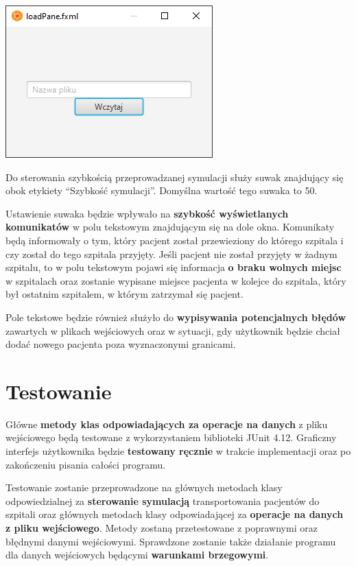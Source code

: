 \documentclass{article}
\begin{document}
    \begin{center}
        \includegraphics{okno.png}
    \end{center}

    Do sterowania szybkością przeprowadzanej symulacji służy suwak znajdujący się obok etykiety ``Szybkość symulacji''. Domyślna wartość tego suwaka to 50.

    Ustawienie suwaka będzie wpływało na \textbf{szybkość wyświetlanych komunikatów} w polu tekstowym znajdującym się na dole okna. Komunikaty będą informowały o tym, który pacjent został przewieziony do którego szpitala i czy został do tego szpitala przyjęty. Jeśli pacjent nie został przyjęty w żadnym szpitalu, to w polu tekstowym pojawi się informacja \textbf{o braku wolnych miejsc} w szpitalach oraz zostanie wypisane miejsce pacjenta w kolejce do szpitala, który był ostatnim szpitalem, w którym zatrzymał się pacjent.

    Pole tekstowe będzie również służyło do \textbf{wypisywania potencjalnych błędów} zawartych w plikach wejściowych oraz w sytuacji, gdy użytkownik będzie chciał dodać nowego pacjenta poza wyznaczonymi granicami.



\section{Testowanie}
    Główne \textbf{metody klas odpowiadających za operacje na danych} z pliku wejściowego będą testowane z wykorzystaniem biblioteki JUnit 4.12. Graficzny interfejs użytkownika będzie \textbf{testowany ręcznie} w trakcie implementacji oraz po zakończeniu pisania całości programu.

    Testowanie zostanie przeprowadzone na głównych metodach klasy odpowiedzialnej za \textbf{sterowanie symulacją} transportowania pacjentów do szpitali oraz głównych metodach klasy odpowiadającej za \textbf{operacje na danych z pliku wejściowego}. Metody zostaną przetestowane z poprawnymi oraz błędnymi danymi wejściowymi. Sprawdzone zostanie także działanie programu dla danych wejściowych będącymi \textbf{warunkami brzegowymi}.
\end{document}
